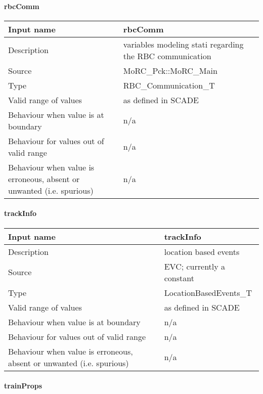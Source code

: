\paragraph{rbcComm}

\begin{longtable}{p{}p{}}
\toprule
Input name				& rbcComm \\
\midrule
Description				& variables modeling stati regarding the RBC communication \\
\midrule
Source					& MoRC\_Pck::MoRC\_Main \\ 
\midrule
Type					& RBC\_Communication\_T \\
\midrule
Valid range of values	& as defined in SCADE \\
\midrule
Behaviour when value is at boundary	& n/a \\
\midrule
Behaviour for values out of valid range	& n/a \\
\midrule
Behaviour when value is erroneous, absent or unwanted (i.e. spurious) & n/a \\
\bottomrule
\end{longtable}

\paragraph{trackInfo}

\begin{longtable}{p{}p{}}
\toprule
Input name				& trackInfo \\
\midrule
Description				& location based events \\
\midrule
Source					& EVC; currently a constant \\ 
\midrule
Type					& LocationBasedEvents\_T \\
\midrule
Valid range of values	& as defined in SCADE \\
\midrule
Behaviour when value is at boundary	& n/a \\
\midrule
Behaviour for values out of valid range	& n/a \\
\midrule
Behaviour when value is erroneous, absent or unwanted (i.e. spurious) & n/a \\
\bottomrule
\end{longtable}

\paragraph{trainProps}


